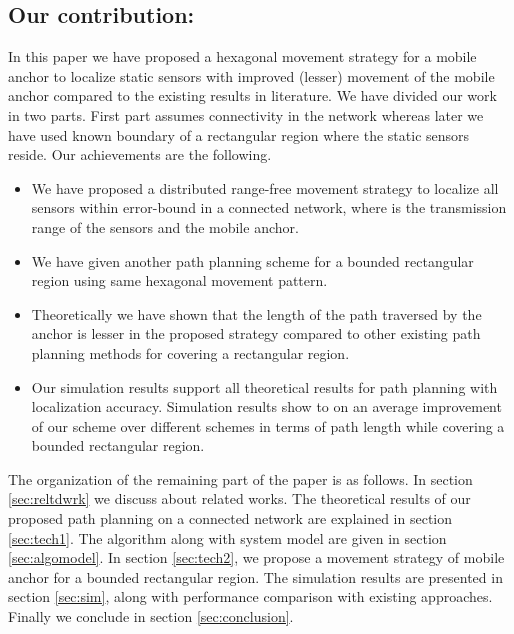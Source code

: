 \documentclass[preprint,11pt]{elsarticle}
\begin{document}
\subsection*{Our contribution:}
In this paper we have proposed a hexagonal movement strategy for a mobile anchor
to localize static sensors with improved (lesser) movement of the mobile anchor
compared to the existing results in literature. We have divided our work in two parts.
First part assumes connectivity in the network whereas later we have used known boundary
of a rectangular region where the static sensors reside. Our achievements are the following.
\begin{itemize}
\item We have proposed a distributed range-free movement strategy to localize all sensors within  error-bound
in a connected network, where  is the transmission range of the sensors and the mobile anchor.
\item We have given another path planning scheme for a bounded rectangular region
using same hexagonal movement pattern.
\item Theoretically we have shown that
the length of the path traversed by the anchor is lesser in the
proposed strategy compared to other existing path planning methods for covering
a rectangular region. \item Our simulation results support all theoretical results for path planning with localization accuracy.
Simulation results show  to  on an average improvement of our scheme over different schemes in
terms of path length while covering a bounded rectangular region.
\end{itemize}

The organization of the remaining part of the paper is as follows. In section \ref{sec:reltdwrk} we discuss
about related works. The theoretical results of our
proposed path planning on a connected network are explained in section \ref{sec:tech1}.
The algorithm along with system model are given in section \ref{sec:algomodel}.
In section \ref{sec:tech2}, we propose a movement strategy of mobile anchor for a bounded rectangular region.
The simulation results are presented in section \ref{sec:sim}, along with performance
comparison with existing approaches. Finally we conclude in section \ref{sec:conclusion}.
\end{document}
